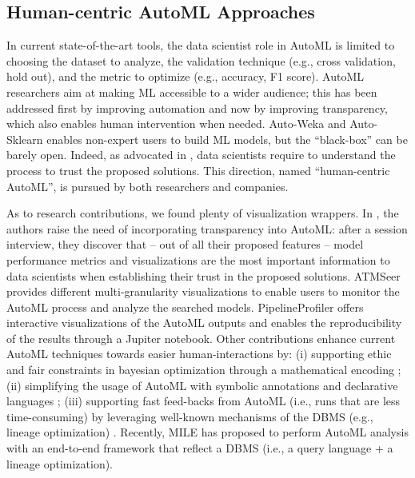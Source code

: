 \subsection{Human-centric AutoML Approaches}
In current state-of-the-art tools, the data scientist role in AutoML is limited to choosing the dataset to analyze, the validation technique (e.g., cross validation, hold out), and the metric to optimize (e.g., accuracy, F1 score).
AutoML researchers aim at making ML accessible to a wider audience;
this has been addressed first by improving automation and now by improving transparency, which also enables human intervention when needed.
Auto-Weka \cite{kotthoff2019auto} and Auto-Sklearn \cite{feurer2019auto} enables non-expert users to build ML models, but the ``black-box'' can be barely open.
Indeed, as advocated in \cite{drozdal2020trust}, data scientists require to understand the process to trust the proposed solutions.
This direction, named ``human-centric AutoML'', is pursued by both researchers and companies.

As to research contributions, we found plenty of visualization wrappers.
In \cite{drozdal2020trust}, the authors raise the need of incorporating transparency into AutoML: after a session interview, they discover that -- out of all their proposed features -- model performance metrics and visualizations are the most important information to data scientists when establishing their trust in the proposed solutions.
ATMSeer \cite{wang2019atmseer} provides different multi-granularity visualizations to enable users to monitor the AutoML process and analyze the searched models.
PipelineProfiler \cite{ono2020pipelineprofiler} offers interactive visualizations of the AutoML outputs and enables the reproducibility of the results through a Jupiter notebook.
Other contributions enhance current AutoML techniques towards easier human-interactions by: (i) supporting ethic and fair constraints in bayesian optimization through a mathematical encoding \cite{perrone2021fair, yaghini2021human}; (ii) simplifying the usage of AutoML with symbolic annotations \cite{peng2020pyglove} and declarative languages \cite{kraska2013mlbase}; (iii) supporting fast feed-backs from AutoML (i.e., runs that are less time-consuming) by leveraging well-known mechanisms of the DBMS (e.g., lineage optimization) \cite{vartak2015supporting, xin2018accelerating}.
Recently, MILE \cite{lee2020human} has proposed to perform AutoML analysis with an end-to-end framework that reflect a DBMS (i.e., a query language + a lineage optimization).

